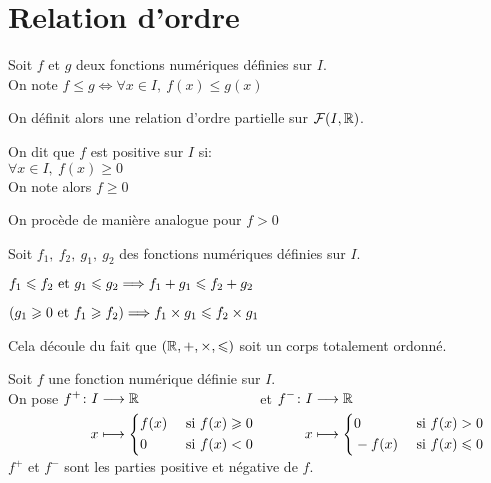\documentclass[12pt,twoside,a4paper]{article}
\begin{document}
	\section{Relation d'ordre}
		\begin{defi}
			Soit $f$ et $g$ deux fonctions numériques définies sur $I$.\\
			On note $f \leqslant g \iff \forall x \in I,\ f(x) \leqslant g(x)$
		\end{defi}
		\begin{flushleft}
			On définit alors une relation d'ordre partielle sur $\mathcal{F}(I,\mathbb{R})$.
		\end{flushleft}
		\begin{defi}
			\begin{liste}
				\item On dit que $f$ est positive sur $I$ si:\\
					$\forall x\in I,\ f(x) \geqslant 0$\\
					On note alors $f\geqslant 0$
				\item On procède de manière analogue pour $f>0$
			\end{liste}
		\end{defi}
		\begin{prop}
			Soit $f_1,\ f_2,\ g_1,\ g_2$ des fonctions numériques définies sur $I$.
			\begin{liste}
				\item $f_1 \leqslant f_2 \text{ et } g_1 \leqslant g_2 \Longrightarrow f_1+g_1 \leqslant f_2 + g_2$
				\item $\left(g_1\geqslant 0 \text{ et } f_1 \geqslant f_2 \right) \Longrightarrow f_1 \times g_1 \leqslant f_2 \times g_1$
			\end{liste}
		\end{prop}
		\begin{preuve}
			Cela découle du fait que $(\mathbb{R},+,\times,\leqslant)$ soit un corps totalement ordonné.
		\end{preuve}
		\begin{defi}
			Soit $f$ une fonction numérique définie sur $I$.\\
			On pose $\begin{aligned}[t]f^{+}\colon I&\longrightarrow\mathbb{R} \\x&\longmapsto\left\{\begin{aligned}& f(x) & \text{ si }f(x)\geqslant 0\\	& 0 & \text{ si }f(x)<0	\end{aligned} \right.\end{aligned}$ et $\begin{aligned}[t]f^{-}\colon I&\longrightarrow\mathbb{R} \\x&\longmapsto\left\{\begin{aligned}& 0 & \text{ si }f(x)> 0\\	& -f(x) & \text{ si }f(x) \leqslant 0	\end{aligned} \right.\end{aligned}$\\
			$f^{+}$ et $f^{-}$ sont les parties positive et négative de $f$.
			\end{defi}
\end{document}
